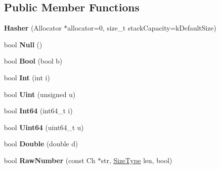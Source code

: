 \subsection*{Public Member Functions}
\begin{DoxyCompactItemize}
\item 
\mbox{\label{classinternal_1_1_hasher_a7b6abfdd3bdc60064a2322cdd20708c1}} 
{\bfseries Hasher} (Allocator $\ast$allocator=0, size\+\_\+t stack\+Capacity=k\+Default\+Size)
\item 
\mbox{\label{classinternal_1_1_hasher_a57c656866aa08cc7c448ce47b7a243c3}} 
bool {\bfseries Null} ()
\item 
\mbox{\label{classinternal_1_1_hasher_a11efd784a4e9c4f8a3dc281552df0486}} 
bool {\bfseries Bool} (bool b)
\item 
\mbox{\label{classinternal_1_1_hasher_aadbadf98ee7c9ab03a636e0f06d38bac}} 
bool {\bfseries Int} (int i)
\item 
\mbox{\label{classinternal_1_1_hasher_a4401600c24c817a45cea6c281438e5b4}} 
bool {\bfseries Uint} (unsigned u)
\item 
\mbox{\label{classinternal_1_1_hasher_ae0579cd54b3c545f77452543793b9a97}} 
bool {\bfseries Int64} (int64\+\_\+t i)
\item 
\mbox{\label{classinternal_1_1_hasher_a14832ac4ec204f1065b929df2c255457}} 
bool {\bfseries Uint64} (uint64\+\_\+t u)
\item 
\mbox{\label{classinternal_1_1_hasher_a83abe847e24ed88d5aab092d840e37c1}} 
bool {\bfseries Double} (double d)
\item 
\mbox{\label{classinternal_1_1_hasher_ae277289ad2fb3a938a6507e566d3c5e2}} 
bool {\bfseries Raw\+Number} (const Ch $\ast$str, \hyperlink{rapidjson_8h_a5ed6e6e67250fadbd041127e6386dcb5}{Size\+Type} len, bool)
\item 
\mbox{\label{classinternal_1_1_hasher_a885f2bf42f2bb64d6f9443129dce3883}} 

\end{DoxyCompactItemize}

